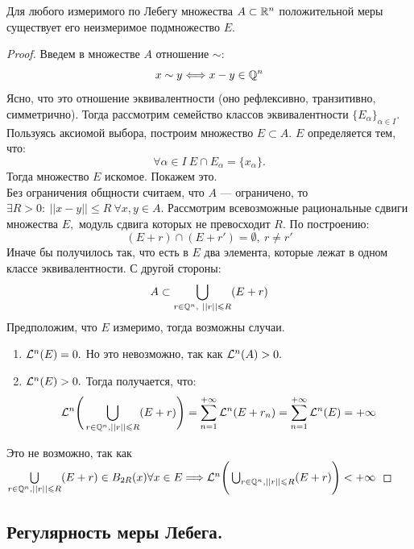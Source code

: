 \begin{theorem}
    Для любого измеримого по Лебегу множества $A \subset \mathbb{R}^n$ положительной меры существует его неизмеримое подмножество $E.$
\end{theorem}
\begin{proof}
    Введем в множестве $A$ отношение $\sim:$
    $$x\sim y \Longleftrightarrow x - y \in \mathbb{Q}^n$$
    Ясно, что это отношение эквивалентности (оно рефлексивно, транзитивно, симметрично). Тогда рассмотрим семейство классов эквивалентности $\{E_{\alpha}\}_{\alpha \in I}.$ Пользуясь аксиомой выбора, построим множество $E \subset A.$ $E$ определяется тем, что:
    $$\forall \alpha \in I \ E \cap E_{\alpha} = \{x_{\alpha}\}.$$
    Тогда множество $E$ искомое. Покажем это.\\ Без ограничения общности считаем, что $A$ --- ограничено, то $\exists R > 0: \ ||x - y|| \leq R \ \forall x, y \in A.$ Рассмотрим всевозможные рациональные сдвиги множества $E,$ модуль сдвига которых не превосходит $R.$ По построению:
    $$(E + r) \cap (E + r') = \emptyset, \ r \neq r'$$
    Иначе бы получилось так, что есть в $E$ два элемента, которые лежат в одном классе эквивалентности. С другой стороны:
    $$A \subset \bigcup_{r \in \Q^n, \ ||r|| \leq R} (E + r)$$
    Предположим, что $E$ измеримо, тогда возможны случаи.
    \begin{enumerate}
        \item $\mathcal{L}^n(E) = 0.$ Но это невозможно, так как $\mathcal{L}^n(A) > 0.$
        \item $\mathcal{L}^n(E) > 0.$ Тогда получается, что:
        $$\mathcal{L} ^n\Bigg(\bigcup_{r \in \mathbb{Q}^n, ||r|| \leqslant R} (E + r)\Bigg) = \sum_{n = 1}^{+\infty} \mathcal{L}^n(E + r_n) =  \sum_{n = 1}^{+\infty} \mathcal{L}^n(E) = +\infty$$
    \end{enumerate}
    Это не возможно, так как $\bigcup\limits_{r \in \mathbb{Q}^n, ||r|| \leqslant R} (E + r) \in B_{2R}(x) \forall x \in E \Longrightarrow \mathcal{L} ^n\Bigg(\bigcup_{r \in \mathbb{Q}^n, ||r|| \leqslant R} (E + r)\Bigg) < + \infty$ 
\end{proof}

\subsection{Регулярность меры Лебега.}

